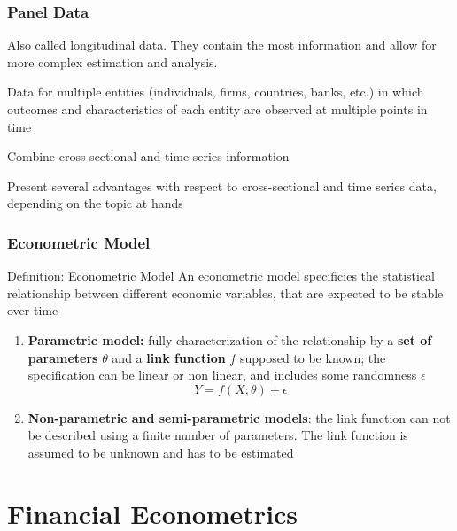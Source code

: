 \documentclass{beamer}
\newenvironment{wideitemize}{\itemize\addtolength{\itemsep}{10pt}}{\enditemize}
\begin{document}
\begin{frame}
  \frametitle{Panel Data}
  Also called longitudinal data. They contain the most information and allow for more complex estimation and analysis.

  \begin{wideitemize}
    \item Data for multiple entities (individuals, firms, countries, banks, etc.) in which outcomes and characteristics of each entity are observed at multiple points in time
    \item Combine cross-sectional and time-series information
    \item Present several advantages with respect to cross-sectional and time series data, depending on the topic at hands
  \end{wideitemize}

\end{frame}


\begin{frame}
  \frametitle{Econometric Model}

  \begin{block}{Definition: Econometric Model}
    An econometric model specificies the statistical relationship between different economic variables, that are expected to be stable over time
  \end{block}

  \begin{enumerate}
  \item \textbf{Parametric model:} fully characterization of the relationship by a \textbf{set of parameters} $\theta$ and a \textbf{link function} $f$ supposed to be known; the specification can be linear or non linear, and includes some randomness $\epsilon$
    \begin{equation*}
      Y = f(X; \theta) + \epsilon
    \end{equation*}

  \item \textbf{Non-parametric and semi-parametric models}: the link function can not be described using a finite number of parameters. The link function is assumed to be unknown and has to be estimated
    
  \end{enumerate}
  
\end{frame}


\section{Financial Econometrics}
\end{document}
